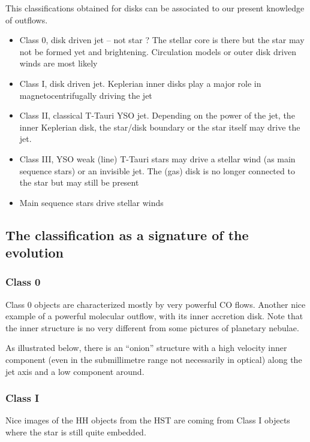 \documentclass[10pt,a4paper,english]{article}
\begin{document}
This classifications obtained for disks can be associated to our present knowledge of outflows.
\begin{itemize}
    \item Class 0, disk driven jet -- not star ? The stellar core is there but the star may not be formed yet and brightening. Circulation models or outer disk driven winds are most likely
    \item Class I, disk driven jet. Keplerian inner disks play a major role in magnetocentrifugally driving the jet
    \item Class II, classical T-Tauri YSO jet. Depending on the power of the jet, the inner Keplerian disk, the star/disk boundary or the star itself may drive the jet.
    \item Class III, YSO weak (line) T-Tauri stars may drive a stellar wind (as main sequence stars) or an invisible jet. The (gas) disk is no longer connected to the star but may still be present
    \item Main sequence stars drive stellar winds
\end{itemize}

\subsection{The classification as a signature of the evolution}

\subsubsection{Class 0}

Class 0 objects are characterized mostly by very powerful CO flows. Another nice example of a powerful molecular outflow, with its inner accretion disk. Note that the inner structure is no very different from some pictures of planetary nebulae.


As illustrated below, there is an ``onion'' structure with a high velocity inner component (even in the submillimetre range not necessarily in optical) along the jet axis and a low component around.

\subsubsection{Class I}

Nice images of the HH objects from the HST are coming from Class I objects where the star is still quite embedded.
\end{document}
